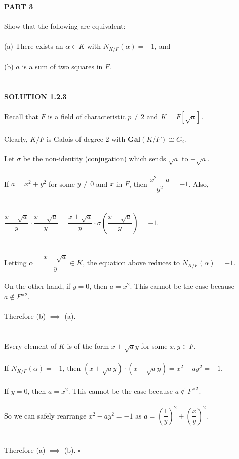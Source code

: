 \documentclass{article}
\begin{document}
\noindent \textbf{PART 3} \\\\
\indent Show that the following are equivalent: \\\\
\indent \indent (a) \indent There exists an $\alpha \in K$ with $N_{K/F}(\alpha) = -1$, and \\\\
\indent \indent (b) \indent $a$ is a sum of two squares in $F$. \\\\
\\
\textbf{SOLUTION 1.2.3} \\\\
\noindent Recall that $F$ is a field of characteristic $p \neq 2$ and $K = F[\sqrt{a}]$. \\\\
Clearly, $K/F$ is Galois of degree $2$ with $\textbf{Gal}(K/F) \cong C_2$. \\\\
Let $\sigma$ be the non-identity (conjugation) which sends $\sqrt{a}$ to $-\sqrt{a}$. \\\\
If $a = x^2 + y^2$ for some $y \neq 0$ and $x$ in $F$, then $\dfrac{x^2-a}{y^2} = -1$. Also, \\\\\\
\indent $\dfrac{x + \sqrt{a}}{y} \cdot \dfrac{x - \sqrt{a}}{y} =\dfrac{x + \sqrt{a}}{y} \cdot \sigma(\dfrac{x + \sqrt{a}}{y}) = -1$. \\\\\\
Letting $\alpha = \dfrac{x + \sqrt{a}}{y} \in K$, the equation above reduces to $N_{K/F}(\alpha) = -1$. \\\\
On the other hand, if $y = 0$, then $a = x^2$. This cannot be the case because $a \notin F^{\times2}$. \\\\
Therefore (b) $\implies$ (a). \\\\\\
Every element of $K$ is of the form $x + \sqrt{a} y$ for some $x, y \in F$. \\\\
If $N_{K/F}(\alpha) = -1$, then $(x + \sqrt{a}y) \cdot (x - \sqrt{a}y) = x^2 - ay^2 = -1$. \\\\
If $y = 0$, then $a = x^2$. This cannot be the case because $a \notin F^{\times2}$. \\\\
So we can safely rearrange $x^2 - ay^2 = -1$ as $a = \left(\dfrac{1}{y}\right)^2 + \left(\dfrac{x}{y}\right)^2$. \\\\\\
Therefore (a) $\implies$ (b). $\square$
\pagebreak
\end{document}
